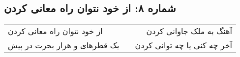 \begin{center}
\section*{شماره ۸: از خود نتوان راه معانی کردن}
\label{sec:008}
\begin{longtable}{l p{0.5cm} r}
از خود نتوان راه معانی کردن
&&
آهنگ به ملک جاوانی کردن
\\
یک قطرهای و هزار بحرت در پیش
&&
آخر چه کنی یا چه توانی کردن
\\
\end{longtable}
\end{center}
